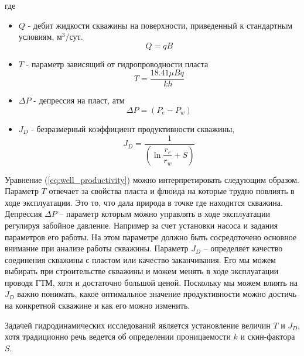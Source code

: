 где
\begin{itemize}
	\item $Q$ - дебит жидкости скважины на поверхности, приведенный к стандартным условиям, м$^3$/сут. $$Q = qB$$

	\item $T$ - параметр зависящий от гидропроводности пласта 
	\begin{equation} \label{eq:T}
		T=\dfrac{18.41\mu B q }{\ k h}
	\end{equation}
	
	\item $\Delta P$ - депрессия на пласт, атм 
	\begin{equation} \label{eq:dP}
		\Delta P = \left(P_e-P_w\right)
	\end{equation}
	
	
	\item $J_D$ - безразмерный коэффициент продуктивности скважины, 
	\begin{equation} \label{eq:JD}
		J_D = \dfrac{1}{ \left(\ln{\dfrac{r_e}{r_w}} + S\right)}
	\end{equation}
	

\end{itemize}

Уравнение (\ref{eq:well_productivity}) можно интерпретировать следующим образом. Параметр $T$ отвечает за свойства пласта и флюида на которые трудно повлиять в ходе эксплуатации. Это то, что дала природа в точке где находится скважина. Депрессия $\Delta P$ -- параметр которым можно управлять в ходе эксплуатации регулируя забойное давление. Например за счет установки насоса и задания параметров его работы. На этом параметре должно быть сосредоточено основное внимание при анализе работы скважины. Параметр $J_D$ -- определяет качество соединения скважины с пластом или качество заканчивания. Его мы можем выбирать при строительстве скважины и можем менять в ходе эксплуатации проводя ГТМ, хотя и достаточно большой ценой. Поскольку мы можем влиять на $J_D$ важно понимать, какое оптимальное значение продуктивности можно достичь на конкретной скважине и как его можно изменить. 

Задачей гидродинамических исследований является установление величин $T$ и $J_D$, хотя традиционно речь ведется об определении проницаемости $k$ и скин-фактора $S$. 




